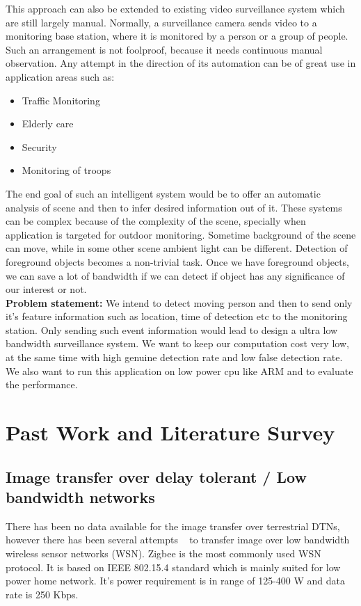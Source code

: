 \indent This approach can also be extended to existing video
surveillance system which are still largely manual.  Normally, a
surveillance camera sends video to a monitoring base station, where it
is monitored by a person or a group of people. Such an arrangement is
not foolproof, because it needs continuous manual observation.  Any
attempt in the direction of its automation can be of great use in
application areas such as:\\
\begin{itemize}
	 \item  Traffic Monitoring
	  \item Elderly care
	    \item Security
	    \item Monitoring of troops
\end{itemize}
\indent The end goal of such an intelligent system would be to offer an
automatic analysis of scene and then to infer desired information out of
it. These systems can be complex because of the complexity of the scene,
specially when application is targeted for outdoor monitoring.  Sometime
background of the scene can move, while in some other scene ambient
light can be different. Detection of foreground objects becomes a
non-trivial task.  Once we have foreground objects, we can save a lot of
bandwidth if we can detect if object has any significance of our
interest or not.\\
\textbf{Problem statement:} We intend to detect moving person and then
to send only it's feature information such as location, time of
detection etc to the monitoring station. Only sending such event
information would lead to design a ultra low bandwidth surveillance
system.  We want to keep our computation cost very low, at the same time
with high genuine detection rate and low false detection rate. We also
want to run this application on low power cpu like ARM and to evaluate
the performance.\\


\section{Past Work and Literature Survey}

\subsection{Image transfer over delay tolerant / Low bandwidth networks}

\indent There has been no data available for the image transfer over
terrestrial DTNs, however there has been several attempts ~\cite{2, 3,
4, 5} to transfer image over low bandwidth wireless sensor networks
(WSN). Zigbee is the most commonly used WSN protocol. It is based on IEEE
802.15.4 standard which is mainly suited for low power home network. It's power
requirement is in range of 125-400 \miew W and data rate is 250 Kbps.\\

